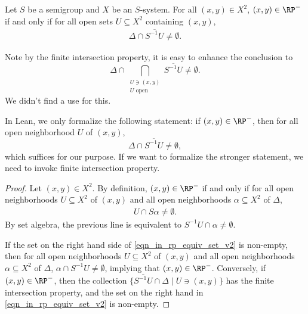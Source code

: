 \begin{lemma}
\label{lemma_rp_iff_nbhd_tran_int_hits_diagonal}
\leanok{}
    Let $S$ be a semigroup and $X$ be an $S$-system.  For all $(x,y) \in X^2$, $(x,y) \in \RP^-$ if and only if for all open sets $U \subseteq X^2$ containing $(x,y)$,
    \begin{align}
    \label{eqn_in_rp_equiv_set_v2}
         \Delta \cap \overline{S^{-1} U} \neq \emptyset.
    \end{align}
\end{lemma}
\begin{remark}
    Note by the finite intersection property, it is easy to enhance the conclusion to
    \[\Delta \cap \bigcap_{\substack{U \ni (x,y) \\ U \text{ open}}} \overline{S^{-1} U} \neq \emptyset.\]
    We didn't find a use for this.
\end{remark}
\begin{remark}
In Lean, we only formalize the following statement:
if $(x, y) \in \RP^-$, then for all open neighborhood $U$ of $(x, y)$, 
\[
    \Delta \cap \overline{S^{-1} U} \neq \emptyset,
\]
which suffices for our purpose.
If we want to formalize the stronger statement, we need to invoke finite intersection property.     
\end{remark}

\begin{proof}
\leanok{}
    Let $(x,y) \in X^2$. By definition, $(x,y) \in \RP^-$ if and only if for all open neighborhoods $U \subseteq X^2$ of $(x,y)$ and all open neighborhoods $\alpha \subseteq X^2$ of $\Delta$,
    \begin{align*}
        U \cap S\alpha \neq \emptyset.
    \end{align*}
    By set algebra, the previous line is equivalent to $S^{-1} U \cap \alpha \neq \emptyset.$

    
    If the set on the right hand side of \eqref{eqn_in_rp_equiv_set_v2} is non-empty, then for all open neighborhoods $U \subseteq X^2$ of $(x,y)$ and all open neighborhoods $\alpha \subseteq X^2$ of $\Delta$, $\alpha \cap S^{-1}U \neq \emptyset$, implying that $(x,y) \in \RP^-$.
    Conversely, if $(x,y) \in \RP^-$, then the collection $\{\overline{S^{-1}U} \cap \Delta \mid U \ni (x,y)\}$ has the finite intersection property, and the set on the right hand in \eqref{eqn_in_rp_equiv_set_v2} is non-empty.
\end{proof}

